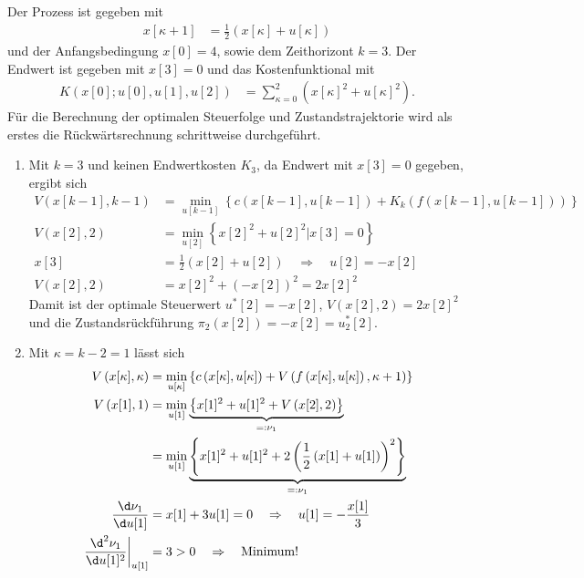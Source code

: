 \begin{exmp}\label{exmp:kap_3_zeitdis_opt_1}
Der Prozess ist gegeben mit
\begin{align*}
	x[\kappa + 1] & = \frac12\left(x[\kappa]+u[\kappa] \right)
\end{align*}
und der Anfangsbedingung $x[0]=4$, sowie dem Zeithorizont $k=3$. Der Endwert ist gegeben mit $x[3]=0$ und das Kostenfunktional mit
\begin{align}
	K\left(x[0];u[0],u[1],u[2] \right) & = \sum\limits_{\kappa=0}^2\left(x[\kappa]^2+u[\kappa]^2 \right).
\end{align}
Für die Berechnung der optimalen Steuerfolge und Zustandstrajektorie wird als erstes die Rückwärtsrechnung schrittweise durchgeführt. 
\begin{enumerate}[label=(S\arabic*)]
  \item Mit $k=3$ und keinen Endwertkosten $K_3$, da Endwert mit $x[3]=0$ gegeben, ergibt sich
\begin{align*}
	V\left(x[k-1],k-1\right) & = \min\limits_{u[k-1]}\left\{c\left(x[k-1],u[k-1]\right) + K_k\left(f(x[k-1],u[k-1]) \right) \right\}\\
	V\left(x[2],2\right) & = \min\limits_{u[2]}\left\{x[2]^2+u[2]^2\bigg| x[3]=0 \right\}\\
	x[3] & = \frac12 \left(x[2] + u[2] \right)\quad \Rightarrow\quad u[2] = -x[2]\\
	V\left(x[2],2\right) & = x[2]^2 + \left(-x[2]\right)^2 = 2x[2]^2
\end{align*}
Damit ist der optimale Steuerwert $u^{\ast}[2]=-x[2]$, $V\left(x[2],2\right)=2x[2]^2$ und die Zustandsrückführung
$\pi_2\left(x[2]\right)=-x[2]=u^{\ast}_2[2]$.
  \item Mit $\kappa=k-2=1$ lässt sich
  \begin{align*}
  	V\left(x[\kappa],\kappa\right) & = \min\limits_{u[\kappa]}\left\{c\left(x[\kappa],u[\kappa]\right)+V\left(f\left(x[\kappa],u[\kappa]
  	\right),\kappa+1 \right) \right\}\\ 
  	V\left(x[1], 1 \right) & = \min\limits_{u[1]}\underbrace{\left\{x[1]^2+u[1]^2 + V\left(x[2], 2 \right) \right\}
  	}_{=:\nu_1}\\
  	& = \min\limits_{u[1]}\underbrace{\left\{x[1]^2+u[1]^2 + 2\left(\frac12\left(x[1]+u[1] \right) \right)^2 \right\}
  	}_{=:\nu_1}\\
  	\frac{\d \nu_1}{\d u[1]} & = x[1]+3u[1]=0\quad \Rightarrow\quad u[1]=-\frac{x[1]}{3}\\
  	\left.\frac{\d^2 \nu_1}{\d u[1]^2}\right|_{u[1]} & = 3 > 0 \quad \Rightarrow\quad\text{Minimum!}\\

\end{align*}
\end{enumerate}
\end{exmp}
